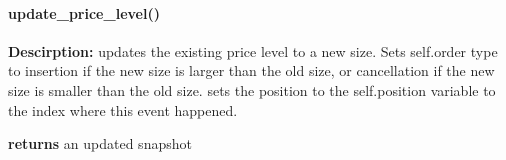 \paragraph{update\_price\_level()}
\hfill \break
\textbf{Descirption:} updates the existing price level to a new size. Sets self.order type to insertion if the new size is larger than the old size, or cancellation if the new size is smaller than the old size. sets the position to the self.position variable to the index where this event happened.

\textbf{returns} an updated snapshot